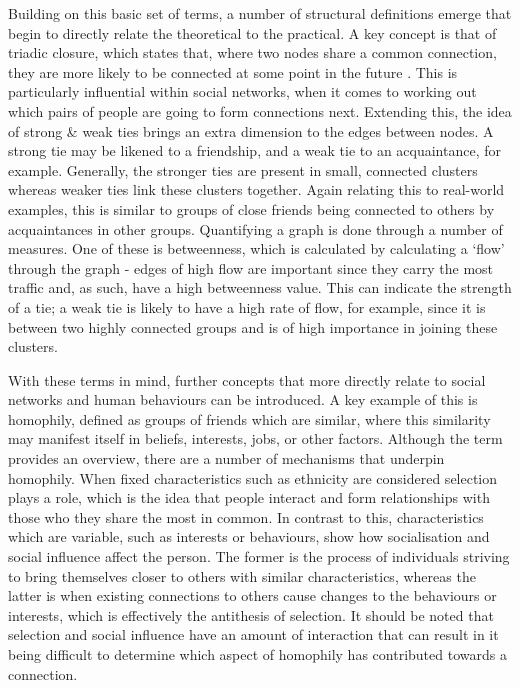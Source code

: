 \documentclass[]{report}
\begin{document}
Building on this basic set of terms, a number of structural definitions emerge that begin to directly relate the theoretical to the practical. A key concept is that of triadic closure, which states that, where two nodes share a common connection, they are more likely to be connected at some point in the future \cite{NetMark-44}. This is particularly influential within social networks, when it comes to working out which pairs of people are going to form connections next. Extending this, the idea of strong \& weak ties brings an extra dimension to the edges between nodes. A strong tie may be likened to a friendship, and a weak tie to an acquaintance, for example. Generally, the stronger ties are present in small, connected clusters whereas weaker ties link these clusters together\cite{NetMark-46}. Again relating this to real-world examples, this is similar to groups of close friends being connected to others by acquaintances in other groups. Quantifying a graph is done through a number of measures. One of these is betweenness, which is calculated by calculating a `flow' through the graph - edges of high flow are important since they carry the most traffic and, as such, have a high betweenness value. This can indicate the strength of a tie; a weak tie is likely to have a high rate of flow, for example, since it is between two highly connected groups and is of high importance in joining these clusters\cite{NetMark-66}.  

With these terms in mind, further concepts that more directly relate to social networks and human behaviours can be introduced. A key example of this is homophily, defined as groups of friends which are similar, where this similarity may manifest itself in beliefs, interests, jobs, or other factors\cite{USN-18}. Although the term provides an overview, there are a number of mechanisms that underpin homophily. When fixed characteristics such as ethnicity are considered selection plays a role, which is the idea that people interact and form relationships with those who they share the most in common. In contrast to this, characteristics which are variable, such as interests or behaviours, show how socialisation and social influence affect the person. The former is the process of individuals striving to bring themselves closer to others with similar characteristics, whereas the latter is when existing connections to others cause changes to the behaviours or interests, which is effectively the antithesis of selection\cite{NetMark-81}. It should be noted that selection and social influence have an amount of interaction that can result in it being difficult to determine which aspect of homophily has contributed towards a connection.
\end{document}

